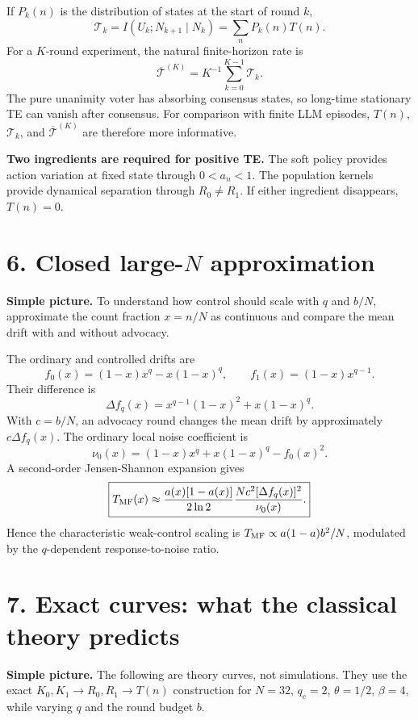 \documentclass[9pt]{extarticle}
\begin{document}
If $P_k(n)$ is the distribution of states at the start of round $k$,
\[
\boxed{\mathcal T_k=I(U_k;N_{k+1}\mid N_k)=\sum_nP_k(n)T(n).}
\]
For a $K$-round experiment, the natural finite-horizon rate is
\[
\boxed{\overline{\mathcal T}^{(K)}=K^{-1}\sum_{k=0}^{K-1}\mathcal T_k.}
\]
The pure unanimity voter has absorbing consensus states, so long-time stationary TE can vanish after consensus. For comparison with finite LLM episodes, $T(n)$, $\mathcal T_k$, and $\overline{\mathcal T}^{(K)}$ are therefore more informative.

\begin{key}
\textbf{Two ingredients are required for positive TE.} The soft policy provides action variation at fixed state through $0<a_n<1$. The population kernels provide dynamical separation through $R_0\neq R_1$. If either ingredient disappears, $T(n)=0$.
\end{key}

\section*{6. Closed large-$N$ approximation}
\textbf{Simple picture.} To understand how control should scale with $q$ and $b/N$, approximate the count fraction $x=n/N$ as continuous and compare the mean drift with and without advocacy.

The ordinary and controlled drifts are
\[
f_0(x)=(1-x)x^q-x(1-x)^q,\qquad f_1(x)=(1-x)x^{q-1}.
\]
Their difference is
\[
\boxed{\Delta f_q(x)=x^{q-1}(1-x)^2+x(1-x)^q.}
\]
With $c=b/N$, an advocacy round changes the mean drift by approximately $c\Delta f_q(x)$. The ordinary local noise coefficient is
\[
\nu_0(x)=(1-x)x^q+x(1-x)^q-f_0(x)^2.
\]
A second-order Jensen-Shannon expansion gives
\[
\boxed{T_{\rm MF}(x)\approx\frac{a(x)[1-a(x)]}{2\ln2}\frac{Nc^2[\Delta f_q(x)]^2}{\nu_0(x)}.}
\]
Hence the characteristic weak-control scaling is $T_{\rm MF}\propto a(1-a)b^2/N$, modulated by the $q$-dependent response-to-noise ratio.

\newpage
\section*{7. Exact curves: what the classical theory predicts}
\textbf{Simple picture.} The following are theory curves, not simulations. They use the exact $K_0,K_1\to R_0,R_1\to T(n)$ construction for $N=32$, $q_c=2$, $\theta=1/2$, $\beta=4$, while varying $q$ and the round budget $b$.
\end{document}
